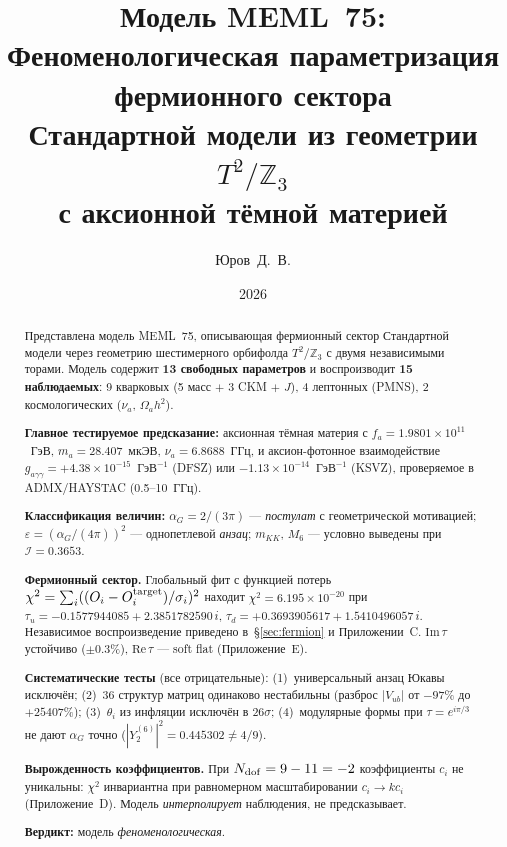 \documentclass[12pt,a4paper]{article}
\title{\textbf{Модель MEML~75:}\\[0.3cm]
\large Феноменологическая параметризация фермионного сектора\\
Стандартной модели из геометрии $T^2/\mathbb{Z}_3$\\
с аксионной тёмной материей}
\author{Юров~Д.~В.}
\date{2026}
\numberwithin{equation}{section}
\begin{document}
\maketitle

\begin{abstract}
\noindent
Представлена модель MEML~75, описывающая фермионный сектор
Стандартной модели через геометрию шестимерного орбифолда
$T^2/\mathbb{Z}_3$ с двумя независимыми торами.
Модель содержит \textbf{13 свободных параметров} и воспроизводит
\textbf{15 наблюдаемых}: 9 кварковых (5 масс $+$ 3 CKM $+$ $J$),
4 лептонных (PMNS), 2 космологических ($\nu_a$, $\Omega_a h^2$).

\textbf{Главное тестируемое предсказание:}
аксионная тёмная материя с
$f_a = 1.9801\times10^{11}$~ГэВ,
$m_a = 28.407$~мкЭВ, $\nu_a = 6.8688$~ГГц, и аксион-фотонное
взаимодействие
$g_{a\gamma\gamma} = +4.38\times10^{-15}$~ГэВ$^{-1}$ (DFSZ)
или $-1.13\times10^{-14}$~ГэВ$^{-1}$ (KSVZ), проверяемое
в ADMX/HAYSTAC (0.5--10~ГГц).

\textbf{Классификация величин:}
$\alpha_G = 2/(3\pi)$ --- \emph{постулат} с геометрической
мотивацией; $\varepsilon = (\alpha_G/(4\pi))^2$ --- однопетлевой
\emph{анзац}; $m_{KK}$, $M_6$ --- условно выведены при
$\mathcal{I} = 0.3653$.

\textbf{Фермионный сектор.} Глобальный фит с функцией потерь
$\chi^2 = \sum_i ((O_i-O_i^{\rm target})/\sigma_i)^2$ находит
$\chi^2 = 6.195\times10^{-20}$ при
$\tau_u = -0.1577944085 + 2.3851782590\,i$,
$\tau_d = +0.3693905617 + 1.5410496057\,i$.
Независимое воспроизведение приведено в~\S\ref{sec:fermion}
и Приложении~C. $\mathrm{Im}\,\tau$ устойчиво ($\pm 0.3\%$),
$\mathrm{Re}\,\tau$ --- soft flat (Приложение~E).

\textbf{Систематические тесты} (все отрицательные):
(1)~универсальный анзац Юкавы исключён;
(2)~36 структур матриц одинаково нестабильны (разброс
$|V_{ub}|$ от $-97\%$ до $+25407\%$);
(3)~$\theta_i$ из инфляции исключён в $26\sigma$;
(4)~модулярные формы при $\tau = e^{i\pi/3}$ не дают
$\alpha_G$ точно ($|Y^{(6)}_2|^2 = 0.445302 \neq 4/9$).

\textbf{Вырожденность коэффициентов.}
При $N_{\rm dof} = 9-11 = -2$ коэффициенты $c_i$ не уникальны:
$\chi^2$ инвариантна при равномерном масштабировании
$c_i \to k c_i$ (Приложение~D). Модель \emph{интерполирует}
наблюдения, не предсказывает.

\textbf{Вердикт:} модель \emph{феноменологическая}.
\end{abstract}

\newpage
\end{document}
